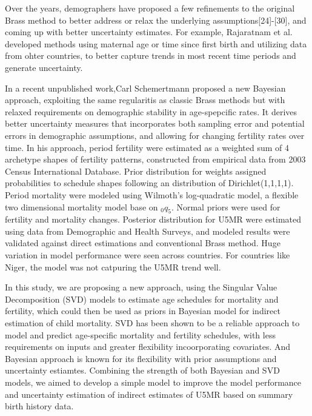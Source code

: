 \documentclass[11pt,letterpaper]{article}
\begin{document}
Over the years, demographers have proposed a few refinements to the original Brass method to better address or relax the underlying assumptions[24]-[30], and coming up with better uncertainty estimates.\cite{Rajaratnam:2010fd} For example, Rajaratnam et al. \cite{Rajaratnam:2010fd} developed methods using maternal age or time since first birth and utilizing data from ohter countries, to better capture trends in most recent time periods and generate uncertainty.

In a recent unpublished work,Carl Schemertmann\cite{Schmertmann:2019wm} proposed a new Bayesian approach, exploiting the same regularitis as classic Brass methods but with relaxed requirements on demographic stability in age-spepcific rates. It derives better uncertainty measures that incorporates both sampling error and potential errors in demographic assumptions, and allowing for changing fertility rates over time. In his approach, period fertility were estimated as a weighted sum of 4 archetype shapes of fertility patterns, constructed from empirical data from 2003 Census International Database. Prior distribution for weights assigned probabilities to schedule shapes following an distribution of Dirichlet(1,1,1,1). Period mortality were modeled using Wilmoth's log-quadratic model, a flexible two dimensional mortality model base on $_0q_5$.\cite{wilmoth2012flexible} Normal priors were used for fertility and mortality changes. Posterior distribution for U5MR were estimated using data from Demographic and Health Surveys, and modeled results were validated against direct estimations and conventional Brass method. Huge variation in model performance were seen across countries. For countries like Niger, the model was not catpuring the U5MR trend well.    

In this study, we are proposing a new approach, using the Singular Value Decomposition (SVD) models to estimate age schedules for mortality and fertility, which could then be used as priors in Bayesian model for indirect estimation of child mortality. SVD has been shown to be a reliable approach to model and predict age-specific mortality and fertility schedules, with less requirements on inputs and greater flexibility incoorporating covariates. \cite{Clark:2015tp} And Bayesian approach is known for its flexibility with prior assumptions and uncertainty estiamtes. Combining the strength of both Bayesian and SVD models, we aimed to develop a simple model to improve the model performance and uncertainty estimation of indirect estimates of U5MR based on summary birth history data. 
\end{document}
